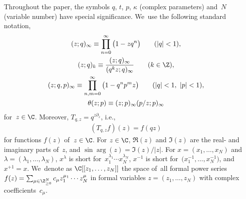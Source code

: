  Throughout the paper, the symbols $q$, $t$, $p$, $\kappa$ (complex parameters) and~$N$ (variable number) have special significance. We~use the following standard notation,
\begin{gather*}
(z;q)_\infty \equiv \prod_{n=0}^\infty\big(1-zq^n\big)\qquad (|q|<1),
\\
(z;q)_k\equiv \frac{(z;q)_\infty}{(q^k z;q)_\infty} \qquad (k\in\Z),
\\
(z;q,p)_\infty\equiv \prod_{n,m=0}^\infty \big(1-q^np^m z\big)\qquad (|q|<1,\ |p|<1),
\\
\theta(z;p) \equiv (z;p)_\infty(p/z;p)_\infty
\end{gather*}
for~$z\in\C$. Moreover, $T_{q,z}=q^{z\partial_z}$, i.e.,
\begin{gather*}
(T_{q,z}f)(z)=f(qz)
\end{gather*}
for functions $f(z)$ of~$z\in\C$.
For $z\in\C$, $\Re(z)$ and $\Im(z)$ are the real- and imaginary parts of~$z$, and $\sin\arg(z) = \Im(z)/|z|$. For $x=(x_1,\dots,x_N)$ and $\lambda=(\lambda_1,\dots,\lambda_N)$, $x^\lambda$ is short for~$x_1^{\lambda_1}\cdots x_N^{\lambda_N}$, $x^{-1}$ is short for~$\big(x_1^{-1},\dots,x_N^{-1}\big)$, and $x^{+1}=x$.
We~denote as $\C[[z_1,\dots,z_N]]$ the space of~all formal power series $f(z)=\sum_{\mu\in\Z_{\geq 0}^N}c_\mu z_1^{\mu_1}\cdots z_N^{\mu}$ in formal variables $z=(z_1,\dots, z_N)$ with complex coefficients~$c_\mu$.
